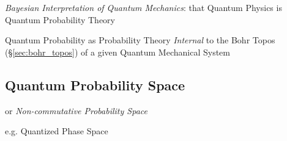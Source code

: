 \emph{Bayesian Interpretation of Quantum Mechanics}: that Quantum Physics is
Quantum Probability Theory

Quantum Probability as Probability Theory \emph{Internal} to the Bohr Topos
(\S\ref{sec:bohr_topos}) of a given Quantum Mechanical System



\subsection{Quantum Probability Space}\label{sec:quantum_probability_space}

or \emph{Non-commutative Probability Space}

e.g. Quantized Phase Space
